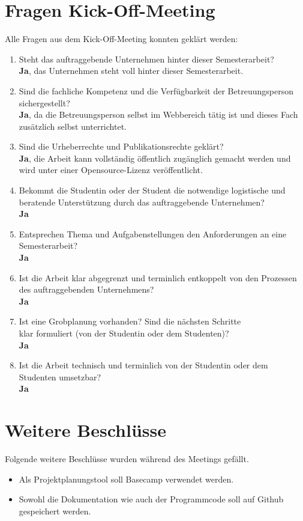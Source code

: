 \documentclass[]{scrreprt}
\begin{document}
    \section{Fragen Kick-Off-Meeting}
    Alle Fragen aus dem Kick-Off-Meeting konnten geklärt werden:
    \begin{enumerate}
        \item Steht das auftraggebende Unternehmen hinter dieser Semesterarbeit? \\
            {\bf Ja}, das Unternehmen steht voll hinter dieser Semesterarbeit.
        \item Sind die fachliche Kompetenz und die Verfügbarkeit der Betreuungsperson sichergestellt? \\
            {\bf Ja}, da die Betreuungsperson selbst im Webbereich tätig ist und dieses Fach zusätzlich selbst unterrichtet.
        \item Sind die Urheberrechte und Publikationsrechte geklärt? \\
            {\bf Ja}, die Arbeit kann vollständig öffentlich zugänglich gemacht
            werden und wird unter einer Opensource-Lizenz veröffentlicht.
        \item Bekommt die Studentin oder der Student die notwendige logistische und beratende
            Unterstützung durch das auftraggebende Unternehmen? \\
            {\bf Ja}
        \item Entsprechen Thema und Aufgabenstellungen den Anforderungen an eine Semesterarbeit? \\
            {\bf Ja}
        \item Ist die Arbeit klar abgegrenzt und terminlich entkoppelt von den Prozessen des auftraggebenden Unternehmens? \\
            {\bf Ja}
        \item Ist eine Grobplanung vorhanden? Sind die nächsten Schritte \\
            klar formuliert (von der Studentin oder dem Studenten)? \\
            {\bf Ja}
        \item Ist die Arbeit technisch und terminlich von der Studentin oder dem Studenten umsetzbar? \\
            {\bf Ja}
    \end{enumerate}
    
    \section{Weitere Beschlüsse}
    Folgende weitere Beschlüsse wurden während des Meetings gefällt.
    \begin{itemize}
        \item Als Projektplanungstool soll Basecamp verwendet werden.
        \item Sowohl die Dokumentation wie auch der Programmcode soll auf Github gespeichert werden.
    \end{itemize}
    
\end{document}
